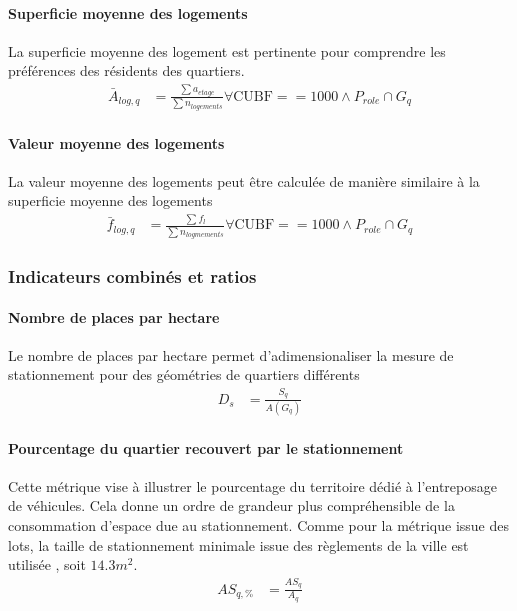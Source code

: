             \paragraph{Superficie moyenne des logements} La superficie moyenne des logement est pertinente pour comprendre les préférences des résidents des quartiers.
            \begin{align}
                \bar{A}_{log,q} &= \frac{\sum{a_{etage}}}{\sum{n_{logements}}} \forall \text{CUBF} ==1000 \wedge P_{role} \cap G_q
            \end{align}
            \paragraph{Valeur moyenne des logements} La valeur moyenne des logements peut être calculée de manière similaire à la superficie moyenne des logements
            \begin{align}
                \bar{f}_{log,q} &= \frac{\sum{f_l}}{\sum{n_{logmements}}} \forall \text{CUBF} ==1000 \wedge P_{role} \cap G_q
            \end{align}
        
        \subsubsection{Indicateurs combinés et ratios}
            \paragraph{Nombre de places par hectare} Le nombre de places par hectare permet d'adimensionaliser la mesure de stationnement pour des géométries de quartiers différents
            \begin{align}
                D_s &= \frac{S_q}{A(G_q)}
            \end{align}
            \paragraph{Pourcentage du quartier recouvert par le stationnement} Cette métrique vise à illustrer le pourcentage du territoire dédié à l'entreposage de véhicules. Cela donne un ordre de grandeur plus compréhensible de la consommation d'espace due au stationnement. Comme pour la métrique issue des lots, la taille de stationnement minimale issue des règlements de la ville est utilisée \parencite{ville_de_quebec_reglement_2009}, soit $14.3m^{2}$.
            \begin{align}
                AS_{q,\%} &= \frac{AS_{q}}{A_q}
            \end{align}
